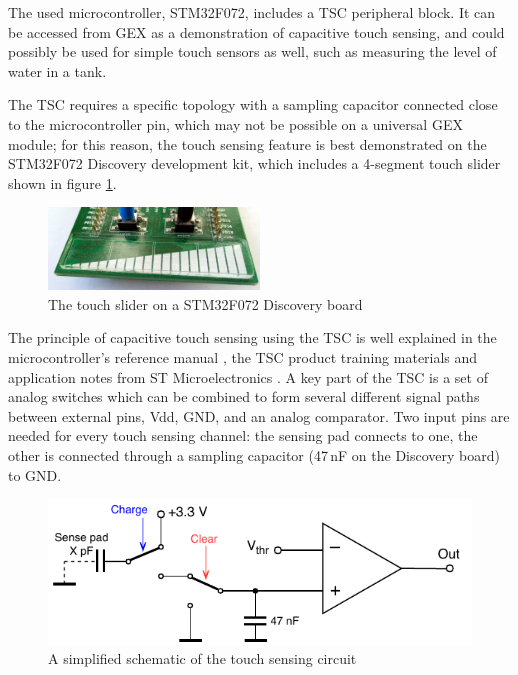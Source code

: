 The used microcontroller, STM32F072, includes a \gls{TSC} peripheral block. It can be accessed from GEX as a demonstration of capacitive touch sensing, and could possibly be used for simple touch sensors as well, such as measuring the level of water in a tank.

The TSC requires a specific topology with a sampling capacitor connected close to the microcontroller pin, which may not be possible on a universal GEX module; for this reason, the touch sensing feature is best demonstrated on the STM32F072 Discovery development kit, which includes a 4-segment touch slider shown in figure \ref{fig:disco-touch}.

\begin{figure}[h]
	\centering
	\includegraphics[width=0.5\textwidth] {img/disco-touch.jpg}
	\caption{\label{fig:disco-touch}The touch slider on a STM32F072 Discovery board}
\end{figure}

The principle of capacitive touch sensing using the \gls{TSC} is well explained in the microcontroller's reference manual \cite{f072-rm}, the \gls{TSC} product training materials \cite{stm-tsc-training, stm-tsc-ppt} and application notes from ST Microelectronics \cite{stm-tsc-an1, stm-tsc-an2, stm-tsc-an3, stm-tsc-an4}. A key part of the \gls{TSC} is a set of analog switches which can be combined to form several different signal paths between external pins, Vdd, \gls{GND}, and an analog comparator. Two input pins are needed for every touch sensing channel: the sensing pad connects to one, the other is connected through a sampling capacitor  (47\,nF on the Discovery board) to \gls{GND}.

\begin{figure}[h]
	\centering
	\includegraphics[scale=1] {img/tsc-function.pdf}
	\caption{\label{fig:tsc-schem}A simplified schematic of the touch sensing circuit}
\end{figure}

